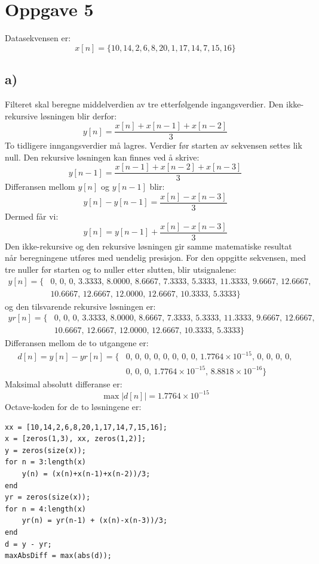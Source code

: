 \hypertarget{oppgave5}{}
\section*{Oppgave 5}
Datasekvensen er:
\[
x[n]
=
\{10,14,2,6,8,20,1,17,14,7,15,16\}
\]
\subsection*{a)}
Filteret skal beregne middelverdien av tre etterfølgende
ingangsverdier.
Den ikke-rekursive løsningen blir derfor:
\[
\boxed{
y[n]
=
\frac{x[n]+x[n-1]+x[n-2]}{3}
}
\]
To tidligere inngangsverdier må lagres. Verdier før starten av
sekvensen settes lik null.
Den rekursive løsningen kan finnes ved å skrive:
\[
y[n-1]
=
\frac{x[n-1]+x[n-2]+x[n-3]}{3}
\]
Differansen mellom $y[n]$ og $y[n-1]$ blir:
\[
y[n]-y[n-1]
=
\frac{x[n]-x[n-3]}{3}
\]
Dermed får vi:
\[
\boxed{
y[n]
=
y[n-1]
+
\frac{x[n]-x[n-3]}{3}
}
\]
Den ikke-rekursive og den rekursive løsningen gir samme
matematiske resultat når beregningene utføres med uendelig
presisjon.
For den oppgitte sekvensen, med tre nuller før starten og to nuller
etter slutten, blir utsignalene:
\[
\begin{aligned}
y[n]=\{&
0,\,
0,\,
0,\,
3.3333,\,
8.0000,\,
8.6667,\,
7.3333,\,
5.3333,\,
11.3333,\,
9.6667,\,
12.6667,\\
&
10.6667,\,
12.6667,\,
12.0000,\,
12.6667,\,
10.3333,\,
5.3333
\}
\end{aligned}
\]
og den tilsvarende rekursive løsningen er:
\[
\begin{aligned}
yr[n]=\{&
0,\,
0,\,
0,\,
3.3333,\,
8.0000,\,
8.6667,\,
7.3333,\,
5.3333,\,
11.3333,\,
9.6667,\,
12.6667,\\
&
10.6667,\,
12.6667,\,
12.0000,\,
12.6667,\,
10.3333,\,
5.3333
\}
\end{aligned}
\]
Differansen mellom de to utgangene er:
\[
\begin{aligned}
d[n]=y[n]-yr[n]=\{&
0,\,
0,\,
0,\,
0,\,
0,\,
0,\,
0,\,
0,\,
1.7764\times 10^{-15},\,
0,\,
0,\,
0,\,
0,\\
&
0,\,
0,\,
0,\,
1.7764\times 10^{-15},\,
8.8818\times 10^{-16}
\}
\end{aligned}
\]
Maksimal absolutt differanse er:
\[
\max |d[n]| = 1.7764\times 10^{-15}
\]
Octave-koden for de to løsningene er:
\begin{verbatim}
xx = [10,14,2,6,8,20,1,17,14,7,15,16];
x = [zeros(1,3), xx, zeros(1,2)];
y = zeros(size(x));
for n = 3:length(x)
    y(n) = (x(n)+x(n-1)+x(n-2))/3;
end
yr = zeros(size(x));
for n = 4:length(x)
    yr(n) = yr(n-1) + (x(n)-x(n-3))/3;
end
d = y - yr;
maxAbsDiff = max(abs(d));
\end{verbatim}
